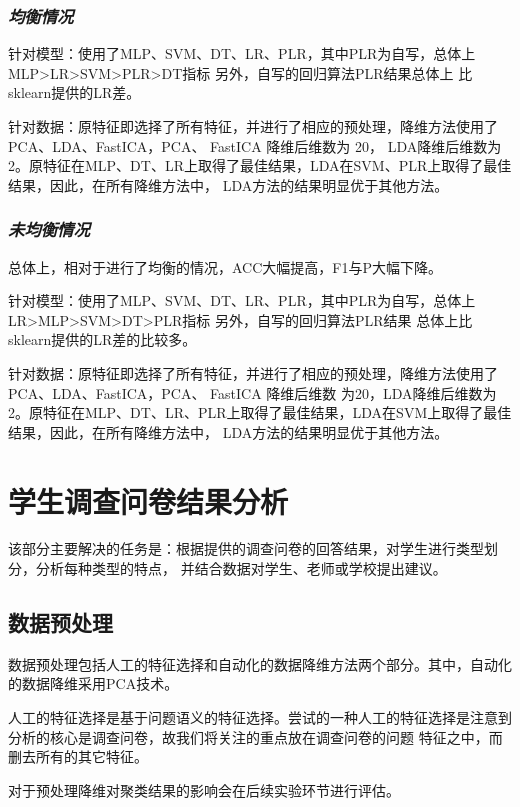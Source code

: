 \documentclass{acm_proc_article-sp}
\begin{document}
\subsubsection{\textsl{均衡情况}}

针对模型：使用了MLP、SVM、DT、LR、PLR，其中PLR为自写，总体上MLP>LR>SVM>PLR>DT指标 另外，自写的回归算法PLR结果总体上
比sklearn提供的LR差。

针对数据：原特征即选择了所有特征，并进行了相应的预处理，降维方法使用了PCA、LDA、FastICA，PCA、 FastICA 降维后维数为
20， LDA降维后维数为2。原特征在MLP、DT、LR上取得了最佳结果，LDA在SVM、PLR上取得了最佳结果，因此，在所有降维方法中，
LDA方法的结果明显优于其他方法。

\subsubsection{\textsl{未均衡情况}}

总体上，相对于进行了均衡的情况，ACC大幅提高，F1与P大幅下降。

针对模型：使用了MLP、SVM、DT、LR、PLR，其中PLR为自写，总体上LR>MLP>SVM>DT>PLR指标 另外，自写的回归算法PLR结果
总体上比sklearn提供的LR差的比较多。

针对数据：原特征即选择了所有特征，并进行了相应的预处理，降维方法使用了PCA、LDA、FastICA，PCA、 FastICA 降维后维数
为20，LDA降维后维数为2。原特征在MLP、DT、LR、PLR上取得了最佳结果，LDA在SVM上取得了最佳结果，因此，在所有降维方法中，
LDA方法的结果明显优于其他方法。

\section{\textsf{学生调查问卷结果分析}}

该部分主要解决的任务是：根据提供的调查问卷的回答结果，对学生进行类型划分，分析每种类型的特点，
并结合数据对学生、老师或学校提出建议。

\subsection{\textsf{数据预处理}}

数据预处理包括人工的特征选择和自动化的数据降维方法两个部分。其中，自动化的数据降维采用PCA技术。

人工的特征选择是基于问题语义的特征选择。尝试的一种人工的特征选择是注意到分析的核心是调查问卷，故我们将关注的重点放在调查问卷的问题
特征之中，而删去所有的其它特征。

对于预处理降维对聚类结果的影响会在后续实验环节进行评估。
\end{document}
